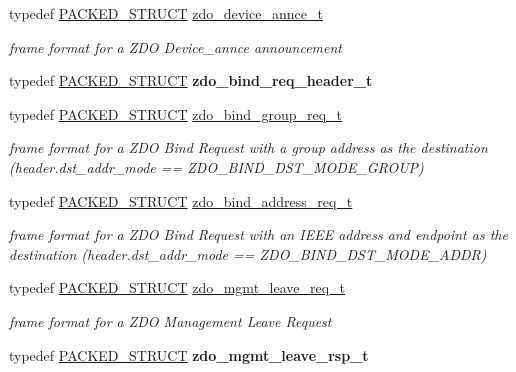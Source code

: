 \begin{DoxyCompactItemize}
typedef \hyperlink{group___s_x_a_ga4233297bd31be5c273d4fb0758cc54d7}{P\-A\-C\-K\-E\-D\-\_\-\-S\-T\-R\-U\-C\-T} \hyperlink{group__zdo_ga95dc0a6858fdb8b8237ef6091d31d2ea}{zdo\-\_\-device\-\_\-annce\-\_\-t}
\begin{DoxyCompactList}\small\item\em frame format for a Z\-D\-O Device\-\_\-annce announcement \end{DoxyCompactList}\item 
typedef \hyperlink{group___s_x_a_ga4233297bd31be5c273d4fb0758cc54d7}{P\-A\-C\-K\-E\-D\-\_\-\-S\-T\-R\-U\-C\-T} {\bfseries zdo\-\_\-bind\-\_\-req\-\_\-header\-\_\-t}
\item 
typedef \hyperlink{group___s_x_a_ga4233297bd31be5c273d4fb0758cc54d7}{P\-A\-C\-K\-E\-D\-\_\-\-S\-T\-R\-U\-C\-T} \hyperlink{group__zdo_ga41ab3318ee2bd538e044d6d6e101f376}{zdo\-\_\-bind\-\_\-group\-\_\-req\-\_\-t}
\begin{DoxyCompactList}\small\item\em frame format for a Z\-D\-O Bind Request with a group address as the destination (header.\-dst\-\_\-addr\-\_\-mode == Z\-D\-O\-\_\-\-B\-I\-N\-D\-\_\-\-D\-S\-T\-\_\-\-M\-O\-D\-E\-\_\-\-G\-R\-O\-U\-P) \end{DoxyCompactList}\item 
typedef \hyperlink{group___s_x_a_ga4233297bd31be5c273d4fb0758cc54d7}{P\-A\-C\-K\-E\-D\-\_\-\-S\-T\-R\-U\-C\-T} \hyperlink{group__zdo_ga68c283a043714a9e40d3674146dd6239}{zdo\-\_\-bind\-\_\-address\-\_\-req\-\_\-t}
\begin{DoxyCompactList}\small\item\em frame format for a Z\-D\-O Bind Request with an I\-E\-E\-E address and endpoint as the destination (header.\-dst\-\_\-addr\-\_\-mode == Z\-D\-O\-\_\-\-B\-I\-N\-D\-\_\-\-D\-S\-T\-\_\-\-M\-O\-D\-E\-\_\-\-A\-D\-D\-R) \end{DoxyCompactList}\item 
typedef \hyperlink{group___s_x_a_ga4233297bd31be5c273d4fb0758cc54d7}{P\-A\-C\-K\-E\-D\-\_\-\-S\-T\-R\-U\-C\-T} \hyperlink{group__zdo_gaa7b8baffae72af214b453440e763da1e}{zdo\-\_\-mgmt\-\_\-leave\-\_\-req\-\_\-t}
\begin{DoxyCompactList}\small\item\em frame format for a Z\-D\-O Management Leave Request \end{DoxyCompactList}\item 
typedef \hyperlink{group___s_x_a_ga4233297bd31be5c273d4fb0758cc54d7}{P\-A\-C\-K\-E\-D\-\_\-\-S\-T\-R\-U\-C\-T} {\bfseries zdo\-\_\-mgmt\-\_\-leave\-\_\-rsp\-\_\-t}
\end{DoxyCompactItemize}
